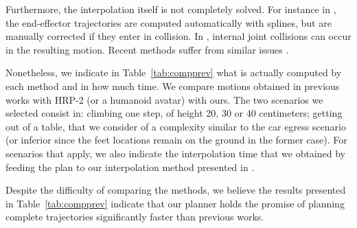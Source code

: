 Furthermore, the interpolation itself is not completely solved. For instance in \cite{DBLP:conf/iser/EscandeKMG08}, the end-effector trajectories are computed automatically with splines, but are manually corrected if they enter in collision. In \citep{Mordatch:2012:DCB:2185520.2185539}, internal joint collisions can occur in the resulting motion.
Recent methods suffer from similar issues \citep{Carpentier2016}.


Nonetheless, we indicate in Table~\ref{tab:compprev} what is actually computed by each method and in how much time.
We compare motions obtained in previous works with HRP-2 (or a humanoid avatar) with ours.
The two scenarios we selected consist in:  climbing one step, of height 20, 30 or 40 centimeters; 
getting out of a table, that we consider of a complexity similar to the car egress scenario (or inferior since the feet locations remain on the ground in the former case).
For scenarios that apply, we also indicate the interpolation time that we obtained by feeding the plan to our interpolation method presented in \cite{Carpentier2016}.

Despite the difficulty of comparing the methods, we believe the results presented in Table~\ref{tab:compprev} indicate that our planner holds the promise of planning complete trajectories significantly faster than previous works.



